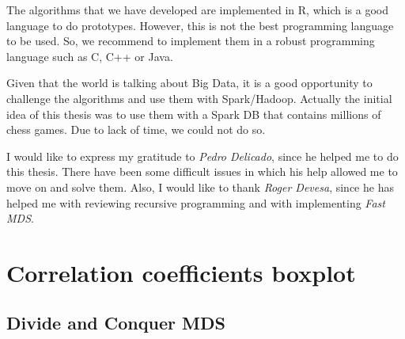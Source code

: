 \documentclass[11pt]{report}
\begin{document}

\indent The algorithms that we have developed are implemented in \textsf{R},
which is a good language to do prototypes. However, this is not the best
programming language to be used. So, we recommend to implement them in a robust 
programming language such as \textsf{C}, \textsf{C++} or \textsf{Java}.

\indent Given that the world is talking about Big Data, it is a good 
opportunity to challenge the algorithms and use them with Spark/Hadoop. Actually
the initial idea of this thesis was to use them with a Spark DB that contains
millions of chess games. Due to lack of time, we could not do so. \\



I would like to express my gratitude to \textit{Pedro Delicado}, since he helped
me to do this thesis. There have been some difficult issues in which his help
allowed me to move on and solve them. Also, I would like to thank
\textit{Roger Devesa}, since he has helped me with reviewing recursive 
programming and with implementing \textit{Fast MDS}.







\appendix 

\chapter{Correlation coefficients boxplot}

\section{Divide and Conquer MDS}
\label{div_conquer_corr}
\end{document}
